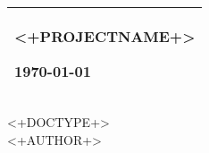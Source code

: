 \noindent%
\begin{tabular}{@{}p{\textwidth}@{}}
  \toprule[2pt]
  \midrule
  \vspace{0.2cm}
  \begin{center}
    \Huge{\textbf{
      <+PROJECTNAME+>
    }}
  \end{center}
  \begin{center}
    \Large{
      \today
    }
  \end{center}
  \vspace{0.2cm}\\
  \midrule
  \toprule[2pt]
\end{tabular}
\vspace{13 cm}
\vfill
\begin{center}
  {\large
    <+DOCTYPE+>
  }\\
  \vspace{0.2cm}
  {\Large
    <+AUTHOR+>
  }
\end{center}
